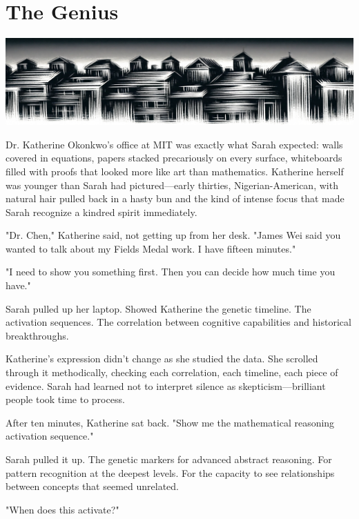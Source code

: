 \chapter{The Genius}
\label{ch:19}



\begin{center}
\includegraphics[width=\textwidth]{images/chapterImages/genesis_sketch_00106_.png}
\end{center}

Dr. Katherine Okonkwo's office at MIT was exactly what Sarah expected: walls covered in equations, papers stacked precariously on every surface, whiteboards filled with proofs that looked more like art than mathematics. Katherine herself was younger than Sarah had pictured—early thirties, Nigerian-American, with natural hair pulled back in a hasty bun and the kind of intense focus that made Sarah recognize a kindred spirit immediately.

"Dr. Chen," Katherine said, not getting up from her desk. "James Wei said you wanted to talk about my Fields Medal work. I have fifteen minutes."

"I need to show you something first. Then you can decide how much time you have."

Sarah pulled up her laptop. Showed Katherine the genetic timeline. The activation sequences. The correlation between cognitive capabilities and historical breakthroughs.

Katherine's expression didn't change as she studied the data. She scrolled through it methodically, checking each correlation, each timeline, each piece of evidence. Sarah had learned not to interpret silence as skepticism—brilliant people took time to process.

After ten minutes, Katherine sat back. "Show me the mathematical reasoning activation sequence."

Sarah pulled it up. The genetic markers for advanced abstract reasoning. For pattern recognition at the deepest levels. For the capacity to see relationships between concepts that seemed unrelated.

"When does this activate?"

